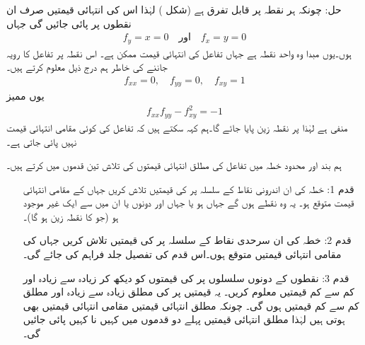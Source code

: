حل:\quad
چونکہ  ہر نقطہ پر قابل تفرق ہے  (شکل ) لہٰذا  اس کی انتہائی قیمتیں صرف ان نقطوں پر پائی جائیں گی جہاں
\begin{align*}
f_y=x=0\quad\text{اور}\quad f_x=y=0
\end{align*}
ہوں۔یوں مبدا وہ واحد نقطہ ہے جہاں  تفاعل کی انتہائی قیمت ممکن ہے۔ اس نقطہ پر تفاعل کا  رویہ  جاننے کی خاطر ہم درج ذیل معلوم کرتے ہیں۔
\begin{align*}
f_{xx}=0,\quad f_{yy}=0,\quad f_{xy}=1
\end{align*}
یوں ممیز
\begin{align*}
f_{xx}f_{yy}-f_{xy}^2=-1
\end{align*}
منفی ہے  لہٰذا  پر نقطہ زین پایا جائے گا۔ہم کہہ سکتے ہیں کہ  تفاعل  کی کوئی مقامی انتہائی قیمت نہیں پائی جاتی ہے۔

ہم بند اور  محدود خطہ  میں تفاعل  کی مطلق انتہائی قیمتوں کی تلاش تین قدموں میں کرتے ہیں۔
\begin{itemize}
\item[قدم 1:]
خطہ  کی ان اندرونی نقاط کے سلسلہ پر  کی قیمتیں تلاش کریں جہاں  کے مقامی انتہائی قیمت متوقع ہو۔ یہ وہ نقطے ہوں گے جہاں   ہو یا جہاں  اور  دونوں یا ان میں سے ایک  غیر موجود ہو (جو  کا نقطہ زین ہو گا)۔ 
\item[قدم 2:]
خطہ   کی ان سرحدی نقاط کے سلسلہ پر   کی قیمتیں تلاش کریں جہاں  کی مقامی  انتہائی قیمتیں متوقع ہوں۔اس قدم کی تفصیل جلد فراہم کی جائے گی۔
\item[قدم 3:]
نقطوں کے دونوں سلسلوں  پر  کی قیمتوں  کو دیکھ کر زیادہ سے زیادہ  اور  کم سے کم قیمتیں معلوم کریں۔ یہ قیمتیں  پر  کی مطلق زیادہ سے زیادہ اور مطلق کم سے کم قیمتیں ہوں گی۔ چونکہ مطلق انتہائی قیمتیں مقامی انتہائی قیمتیں بھی ہوتی ہیں لہٰذا  مطلق انتہائی قیمتیں پہلے دو قدموں میں کہیں نا کہیں پائی جائیں گی۔ 
\end{itemize}


